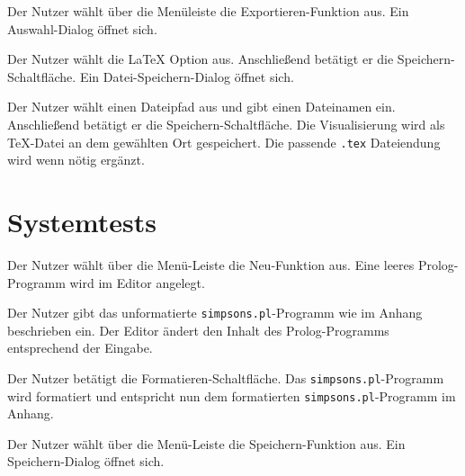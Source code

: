\documentclass[parskip=full,11pt,twoside]{scrartcl}
\begin{document}


{Der Nutzer wählt über die Menüleiste die Exportieren-Funktion aus.}
{Ein Auswahl-Dialog öffnet sich.}

{Der Nutzer wählt die LaTeX Option aus. Anschließend betätigt er die Speichern-Schaltfläche.}
{Ein Datei-Speichern-Dialog öffnet sich.}

{Der Nutzer wählt einen Dateipfad aus und gibt einen Dateinamen ein. Anschließend betätigt er die Speichern-Schaltfläche.}
{Die Visualisierung wird als TeX-Datei an dem gewählten Ort gespeichert. Die passende \texttt{.tex} Dateiendung wird wenn nötig ergänzt.}


\newpage
\section{Systemtests}


{Der Nutzer wählt über die Menü-Leiste die Neu-Funktion aus.}
{Eine leeres Prolog-Programm wird im Editor angelegt.}

{Der Nutzer gibt das unformatierte \texttt{simpsons.pl}-Programm wie im Anhang beschrieben ein.}
{Der Editor ändert den Inhalt des Prolog-Programms entsprechend der Eingabe.}

{Der Nutzer betätigt die Formatieren-Schaltfläche.}
{Das \texttt{simpsons.pl}-Programm wird formatiert und entspricht nun dem formatierten \texttt{simpsons.pl}-Programm im Anhang.}

{Der Nutzer wählt über die Menü-Leiste die Speichern-Funktion aus.}
{Ein Speichern-Dialog öffnet sich.}
\end{document}
